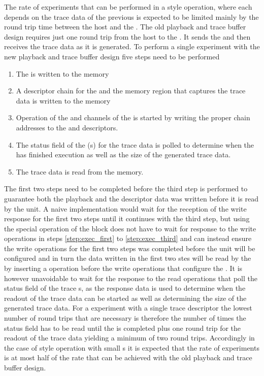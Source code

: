 The rate of experiments that can be performed in a \HWinTheLoop{} style operation, where each \PlaybackProgram{} depends on the trace data of the previous \PlaybackProgram{} is expected to be limited mainly by the round trip time between the host and the \FPGA{}. The old playback and trace buffer design requires just one round trip from the host to the \FPGA{}. It sends the \PlaybackProgram{} and then receives the trace data as it is generated.
To perform a single experiment with the new playback and trace buffer design five steps need to be performed
\begin{enumerate}
    \item\label{step:exec_first} The \PlaybackProgram{} is written to the \DDR{} memory
    \item A descriptor{} chain for the \PlaybackProgram{} and the memory region that captures the trace data is written to the \descriptor{} memory
    \item\label{step:exec_third} Operation of the \SToMM{} and \MMToS{} channels of the \AXIDMA{} is started by writing the proper \descriptor{} chain addresses to the \curdesc{} and \taildesc{} descriptors.
    \item The status field of the \descriptor{}(s) for the trace data is polled to determine when the \PlaybackProgram{} has finished execution as well as the size of the generated trace data.
    \item The trace data is read from the \DDR{} memory.
\end{enumerate}
The first two steps need to be completed before the third step is performed to guarantee both the playback and the descriptor data was written before it is read by the \AXIDMA{} unit.
A naive implementation would wait for the reception of the write response for the first two steps until it continues with the third step, but using the special \globalfence{} operation of the \FAXI{} block \ayo{} does not have to wait for response to the write operations in steps \autoref{step:exec_first} to \autoref{step:exec_third} and can instead ensure the write operations for the first two steps was completed before the \AXIDMA{} unit will be configured and in turn the data written in the first two stes will be read by the \AXIDMA{} by inserting a \globalfence{} operation before the write operations that configure the \AXIDMA{}. It is however unavoidable to wait for the response to the read operations that poll the status field of the trace \descriptor{}s, as the response data is used to determine when the readout of the trace data can be started as well as determining the size of the generated trace data. For a experiment with a single trace descriptor the lowest number of round trips that are necessary is therefore the number of times the status field has to be read until the \PlaybackProgram{} is completed plus one round trip for the readout of the trace data yielding a minimum of two round trips.
Accordingly in the case of \HWinTheLoop{} style operation with small \PlaybackProgram{}s it is expected that the rate of experiments is at most half of the rate that can be achieved with the old playback and trace buffer design.

